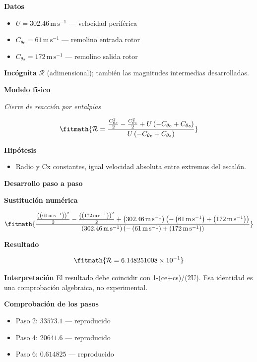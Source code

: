 \documentclass[10pt,openany]{book}
\begin{document}
\noindent\textbf{Datos}
\begin{itemize}
\item $U = 302.46\,\mathrm{m}\,\mathrm{s}^{-1}$ — velocidad periférica
\item $C_{\theta e} = 61\,\mathrm{m}\,\mathrm{s}^{-1}$ — remolino entrada rotor
\item $C_{\theta s} = 172\,\mathrm{m}\,\mathrm{s}^{-1}$ — remolino salida rotor
\end{itemize}

\noindent\textbf{Incógnita}
$\mathcal{R}$ (adimensional); también las magnitudes intermedias desarrolladas.

\noindent\textbf{Modelo físico}

\noindent\textit{Cierre de reacción por entalpías}

\[
\fitmath{\mathcal R=\frac{\frac{C_{\theta e}^{2}}{2} - \frac{C_{\theta s}^{2}}{2} + U \left(- C_{\theta e} + C_{\theta s}\right)}{U \left(- C_{\theta e} + C_{\theta s}\right)}}
\]

\noindent\textbf{Hipótesis}
\begin{itemize}
\item Radio y Cx constantes, igual velocidad absoluta entre extremos del escalón.
\end{itemize}

\noindent\textbf{Desarrollo paso a paso}



\noindent\textbf{Sustitución numérica}

\[
\fitmath{\frac{\frac{\left(\left(61\,\mathrm{m}\,\mathrm{s}^{-1}\right)\right)^{2}}{2} - \frac{\left(\left(172\,\mathrm{m}\,\mathrm{s}^{-1}\right)\right)^{2}}{2} + \left(302.46\,\mathrm{m}\,\mathrm{s}^{-1}\right) \left(- \left(61\,\mathrm{m}\,\mathrm{s}^{-1}\right) + \left(172\,\mathrm{m}\,\mathrm{s}^{-1}\right)\right)}{\left(302.46\,\mathrm{m}\,\mathrm{s}^{-1}\right) \left(- \left(61\,\mathrm{m}\,\mathrm{s}^{-1}\right) + \left(172\,\mathrm{m}\,\mathrm{s}^{-1}\right)\right)}}
\]

\noindent\textbf{Resultado}

\[
\fitmath{\mathcal R=6.148251008\times10^{-1}}
\]

\noindent\textbf{Interpretación}
El resultado debe coincidir con 1-(ce+cs)/(2U). Esa identidad es una comprobación algebraica, no experimental.

\noindent\textbf{Comprobación de los pasos}
\begin{itemize}
\item Paso 2: $33573.1$ — reproducido
\item Paso 4: $20641.6$ — reproducido
\item Paso 6: $0.614825$ — reproducido
\end{itemize}
\end{document}
